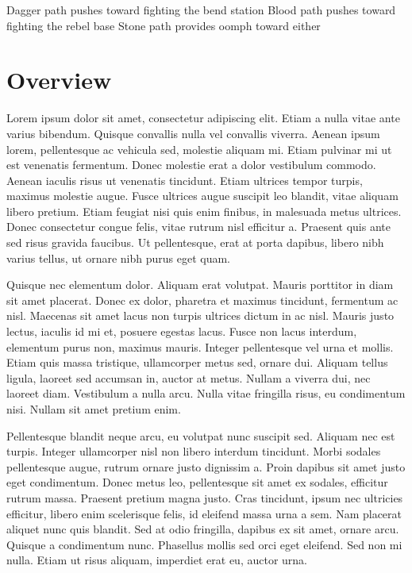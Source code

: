 \documentclass{novanarrative}
\begin{document}
Dagger path pushes toward fighting the bend station
Blood path pushes toward fighting the rebel base
Stone path provides oomph toward either

\section{Overview}

Lorem ipsum dolor sit amet, consectetur adipiscing elit. Etiam a nulla vitae ante varius bibendum. Quisque convallis nulla vel convallis viverra. Aenean ipsum lorem, pellentesque ac vehicula sed, molestie aliquam mi. Etiam pulvinar mi ut est venenatis fermentum. Donec molestie erat a dolor vestibulum commodo. Aenean iaculis risus ut venenatis tincidunt. Etiam ultrices tempor turpis, maximus molestie augue. Fusce ultrices augue suscipit leo blandit, vitae aliquam libero pretium. Etiam feugiat nisi quis enim finibus, in malesuada metus ultrices. Donec consectetur congue felis, vitae rutrum nisl efficitur a. Praesent quis ante sed risus gravida faucibus. Ut pellentesque, erat at porta dapibus, libero nibh varius tellus, ut ornare nibh purus eget quam.

Quisque nec elementum dolor. Aliquam erat volutpat. Mauris porttitor in diam sit amet placerat. Donec ex dolor, pharetra et maximus tincidunt, fermentum ac nisl. Maecenas sit amet lacus non turpis ultrices dictum in ac nisl. Mauris justo lectus, iaculis id mi et, posuere egestas lacus. Fusce non lacus interdum, elementum purus non, maximus mauris. Integer pellentesque vel urna et mollis. Etiam quis massa tristique, ullamcorper metus sed, ornare dui. Aliquam tellus ligula, laoreet sed accumsan in, auctor at metus. Nullam a viverra dui, nec laoreet diam. Vestibulum a nulla arcu. Nulla vitae fringilla risus, eu condimentum nisi. Nullam sit amet pretium enim.

Pellentesque blandit neque arcu, eu volutpat nunc suscipit sed. Aliquam nec est turpis. Integer ullamcorper nisl non libero interdum tincidunt. Morbi sodales pellentesque augue, rutrum ornare justo dignissim a. Proin dapibus sit amet justo eget condimentum. Donec metus leo, pellentesque sit amet ex sodales, efficitur rutrum massa. Praesent pretium magna justo. Cras tincidunt, ipsum nec ultricies efficitur, libero enim scelerisque felis, id eleifend massa urna a sem. Nam placerat aliquet nunc quis blandit. Sed at odio fringilla, dapibus ex sit amet, ornare arcu. Quisque a condimentum nunc. Phasellus mollis sed orci eget eleifend. Sed non mi nulla. Etiam ut risus aliquam, imperdiet erat eu, auctor urna.
\end{document}
